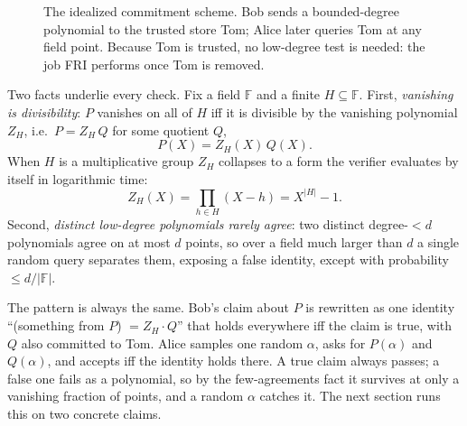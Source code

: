 \documentclass[11pt]{article}
\begin{document}
\begin{figure}[htbp]\centering
{}
\caption{The idealized commitment scheme. Bob sends a bounded-degree polynomial to the trusted store
Tom; Alice later queries Tom at any field point. Because Tom is trusted, no low-degree test is needed:
the job FRI performs once Tom is removed.}
\label{fig:tom}
\end{figure}

Two facts underlie every check. Fix a field $\mathbb{F}$ and a finite $H\subseteq\mathbb{F}$. First,
\emph{vanishing is divisibility}: $P$ vanishes on all of $H$ iff it is divisible by the vanishing
polynomial $Z_H$, i.e.\ $P=Z_H\,Q$ for some quotient $Q$,
\begin{equation}
  P(X) = Z_H(X)\,Q(X).
\end{equation}
When $H$ is a multiplicative group $Z_H$ collapses to a form the verifier evaluates by itself in
logarithmic time:
\begin{equation}
  Z_H(X) = \prod_{h\in H}(X-h) = X^{|H|}-1 .
\end{equation}
Second, \emph{distinct low-degree polynomials rarely agree}: two distinct degree-$<d$ polynomials agree
on at most $d$ points, so over a field much larger than $d$ a single random query separates them,
exposing a false identity, except with probability $\le d/|\mathbb{F}|$.

The pattern is always the same. Bob's claim about $P$ is rewritten as one identity ``(something from
$P$) $=Z_H\cdot Q$'' that holds everywhere iff the claim is true, with $Q$ also committed to Tom. Alice
samples one random $\alpha$, asks for $P(\alpha)$ and $Q(\alpha)$, and accepts iff the identity holds
there. A true claim always passes; a false one fails as a polynomial, so by the few-agreements fact it
survives at only a vanishing fraction of points, and a random $\alpha$ catches it. The next section runs
this on two concrete claims.
\end{document}
